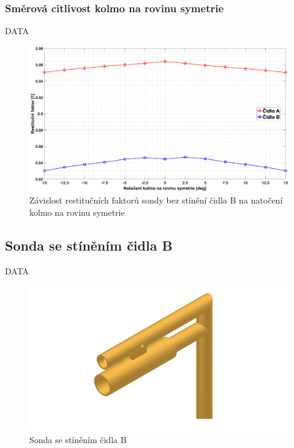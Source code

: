         \subsubsection{Směrová citlivost kolmo na rovinu symetrie}
            DATA
            
             \begin{figure}[ht!]
                \centering
                \includegraphics*[width=\textwidth, trim={5.9cm 1.0cm 5.8cm 2.0cm}]{400_SIMULACE_KONSTRUKCNICH_UPRAV/Grafy/01_kolma_rovina}
                \caption{Závislost restitučních faktorů sondy bez stínění čidla B na natočení kolmo na rovinu symetrie}
                \label{fig:sonda-bez-stineni-kolma-rovina}
            \end{figure}
    \newpage
    \subsection{Sonda se stíněním čidla B}
        DATA
        
        \begin{figure}[ht!]
            \centering
            \includegraphics[width=\textwidth]{400_SIMULACE_KONSTRUKCNICH_UPRAV/Vykresy_rendery/Sonda_se_stinenim_B.png}
            \caption{Sonda se stíněním čidla B}
            \label{fig:sonda-se-stinenim-B}
        \end{figure}
    

